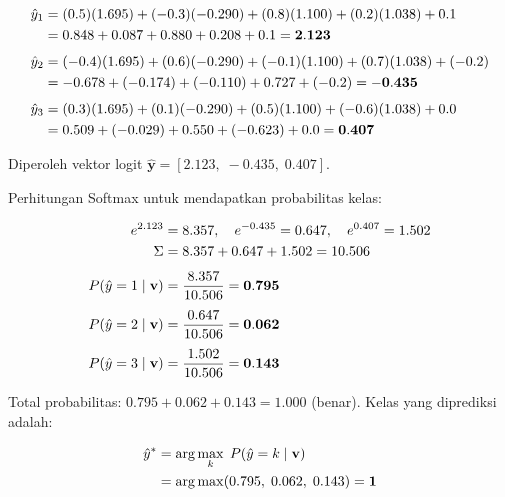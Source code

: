\vspace{0.5cm}
\begin{align*}
  \hat{y}_1
  &= (0.5)(1.695) + (-0.3)(-0.290) + (0.8)(1.100) + (0.2)(1.038) + 0.1 \notag \\
  &= 0.848 + 0.087 + 0.880 + 0.208 + 0.1
   = \mathbf{2.123} \\[4pt]
  \hat{y}_2
  &= (-0.4)(1.695) + (0.6)(-0.290) + (-0.1)(1.100) + (0.7)(1.038) + (-0.2) \notag \\
  &= -0.678 + (-0.174) + (-0.110) + 0.727 + (-0.2)
   = \mathbf{-0.435} \\[4pt]
  \hat{y}_3
  &= (0.3)(1.695) + (0.1)(-0.290) + (0.5)(1.100) + (-0.6)(1.038) + 0.0 \notag \\
  &= 0.509 + (-0.029) + 0.550 + (-0.623) + 0.0
   = \mathbf{0.407}
\end{align*}
\vspace{0.5cm}
 
\noindent
Diperoleh vektor logit $\hat{\mathbf{y}} = [2.123,\; -0.435,\; 0.407]$.
 
\noindent Perhitungan Softmax untuk mendapatkan probabilitas kelas:
 
\vspace{0.5cm}
\begin{align*}
  e^{2.123} &= 8.357, \quad
  e^{-0.435} = 0.647, \quad
  e^{0.407} = 1.502 \notag \\
  \Sigma &= 8.357 + 0.647 + 1.502 = 10.506 \notag \\[4pt]
  P(\hat{y}=1\mid\mathbf{v})
  &= \frac{8.357}{10.506} = \mathbf{0.795} \\[4pt]
  P(\hat{y}=2\mid\mathbf{v})
  &= \frac{0.647}{10.506} = \mathbf{0.062} \\[4pt]
  P(\hat{y}=3\mid\mathbf{v})
  &= \frac{1.502}{10.506} = \mathbf{0.143}
\end{align*}
\vspace{0.5cm}
 
\noindent
Total probabilitas: $0.795 + 0.062 + 0.143 = 1.000$ (benar).
Kelas yang diprediksi adalah:
 
\vspace{0.5cm}
\begin{align}
  \hat{y}^* &= \arg\max_k\; P(\hat{y}=k\mid\mathbf{v}) \notag \\
  &= \arg\max(0.795,\; 0.062,\; 0.143) = \mathbf{1}
\end{align}
\vspace{0.5cm}
 
